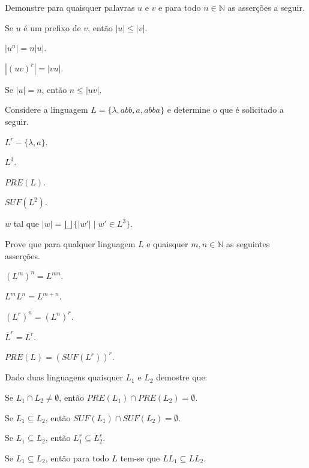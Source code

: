 \begin{problem}\label{prob:Linguagem2}
	Demonstre para quaisquer palavras $u$ e $v$ e para todo $n \in \mathbb{N}$ as asserções a seguir.
\end{problem}

\begin{exerList}
	\item Se $u$ é um prefixo de $v$, então $|u| \leq |v|$.
	\item $|u^n| = n|u|$.
	\item $|(uv)^r| = |vu|$.
	\item Se $|u| = n$, então $n \leq |uv|$.
\end{exerList}

\begin{problem}\label{prob:Linguagem3}
	Considere a linguagem $L = \{\lambda, abb, a, abba\}$ e determine o que é solicitado a seguir.
\end{problem}

\begin{exerList}
	\item $L^r - \{\lambda, a\}$.
	\item $L^3$.
	\item $PRE(L)$.
	\item $SUF(L^2)$.
	\item $w$ tal que $|w| = \bigsqcup \{|w'| \mid w' \in L^3\}$.
\end{exerList}

\begin{problem}\label{prob:Linguagem4}
	Prove que para qualquer linguagem $L$ e quaisquer $m,n \in \mathbb{N}$ as seguintes asserções.
\end{problem}

\begin{exerList}
	\item $(L^m)^n = L^{mn}$.
	\item $L^mL^n = L^{m+n}$.
	\item $(L^r)^n = (L^n)^r$.
	\item $\overline{L}^r = \overline{L^r}$.
	\item $PRE(L) = (SUF(L^r))^r$.
\end{exerList}

\begin{problem}\label{prob:Linguagem5}
	Dado duas linguagens quaisquer $L_1$ e $L_2$ demostre que:
\end{problem}

\begin{exerList}
	\item Se $L_1 \cap L_2 \neq \emptyset$, então $PRE(L_1) \cap PRE(L_2) = \emptyset$.
	\item Se $L_1 \subseteq L_2$, então $SUF(L_1) \cap SUF(L_2) = \emptyset$.
	\item Se $L_1 \subseteq L_2$, então $L_1^r \subseteq L_2^r$.
	\item Se $L_1 \subseteq L_2$, então para todo $L$ tem-se que $LL_1 \subseteq LL_2$. 
\end{exerList}

